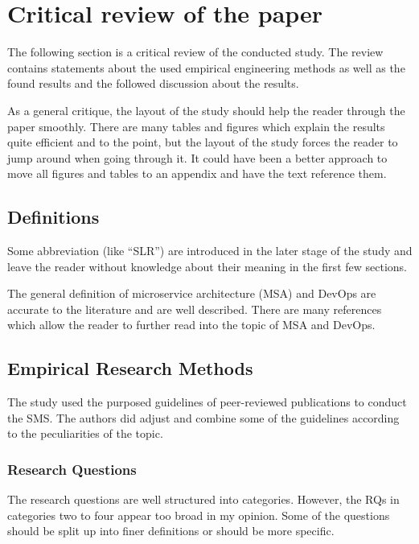 \section{Critical review of the paper}
\label{sec:review}

The following section is a critical review of the conducted study.
The review contains statements about the used empirical engineering methods
as well as the found results and the followed discussion about the results.

As a general critique, the layout of the study should help
the reader through the paper smoothly.
There are many tables and figures which explain the results
quite efficient and to the point, but the layout of the study forces the
reader to jump around when going through it. It could have been
a better approach to move all figures and tables to an appendix
and have the text reference them.

\subsection{Definitions}

Some abbreviation (like ``SLR'') are introduced in the later stage of
the study and leave the reader without knowledge about their meaning
in the first few sections.

The general definition of microservice architecture (MSA) and DevOps
are accurate to the literature and are well described. There are
many references which allow the reader to further read into the topic
of MSA and DevOps.

\subsection{Empirical Research Methods}

The study used the purposed guidelines of peer-reviewed publications
to conduct the SMS. The authors did adjust and combine some of the guidelines
according to the peculiarities of the topic.

\subsubsection{Research Questions}

The research questions are well structured into categories.
However, the RQs in categories two to four appear too broad
in my opinion. Some of the questions should be split up into finer definitions or
should be more specific.

